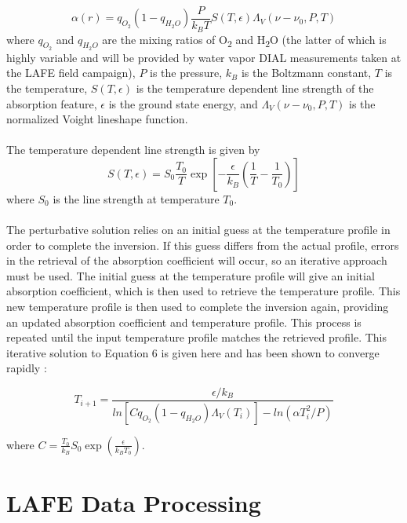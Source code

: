 \documentclass[twoside]{article}
\begin{document}
\begin{equation}
	\alpha (r) = q_{O_2} (1 - q_{H_2 O}) \frac{P}{k_B T} S(T,\epsilon) \Lambda_V(\nu - \nu_0,P,T)
\end{equation} 
\noindent where $q_{O_2}$ and $q_{H_2 O}$ are the mixing ratios of O\textsubscript{2} and H\textsubscript{2}O (the latter of which is highly variable and will be provided by water vapor DIAL measurements \cite{Spuler2015} taken at the LAFE field campaign), $P$ is the pressure, $k_B$ is the Boltzmann constant, $T$ is the temperature, $S(T,\epsilon)$ is the temperature dependent line strength of the absorption feature, $\epsilon$ is the ground state energy, and $\Lambda_V(\nu - \nu_0,P,T)$ is the normalized Voight lineshape function.
\\
\\
The temperature dependent line strength is given by \cite{Korb1982}
\begin{equation}
	S(T,\epsilon) = S_0 \frac{T_0}{T} \exp \left[-\frac{\epsilon}{k_B}\left( \frac{1}{T}-\frac{1}{T_0}\right) \right]
\end{equation}
\noindent where $S_0$ is the line strength at temperature $T_0$. 
\\
\\
The perturbative solution relies on an initial guess at the temperature profile in order to complete the inversion. 
If this guess differs from the actual profile, errors in the retrieval of the absorption coefficient will occur, so an iterative approach must be used.
 The initial guess at the temperature profile will give an initial absorption coefficient, which is then used to retrieve the temperature profile. 
 This new temperature profile is then used to complete the inversion again, providing an updated absorption coefficient and temperature profile. 
 This process is repeated until the input temperature profile matches the retrieved profile. 
 This iterative solution to Equation 6 is given here and has been shown to converge rapidly \cite{Korb1982}:

\begin{equation}
	T_{i+1} = \frac{\epsilon/k_B}{ln[C q_{O_2} (1 - q_{H_2 O}) \Lambda_V (T_i)] - ln(\alpha T_i^2 / P)}
\end{equation}

\noindent where $C = \frac{T_0}{k_B} S_0 \exp\left(\frac{\epsilon}{k_B T_0}\right)$.

\section{LAFE Data Processing}
\end{document}
